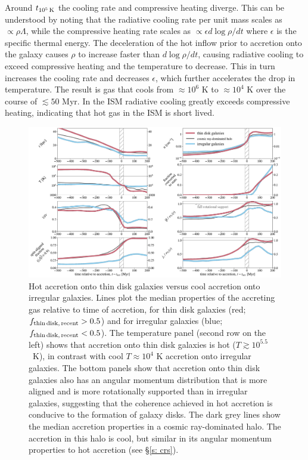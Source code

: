 \documentclass[fleqn,usenatbib]{mnras}
\newcommand{\fthin}{f_{\rm thin\,disk,\,recent}}
\newcommand{\tcools}{t_{10^5\,{\rm K}}}
\begin{document}
Around $\tcools$ the cooling rate and compressive heating diverge.
This can be understood by noting that the radiative cooling rate per unit mass scales as $\propto\rho\Lambda$, while the compressive heating rate scales as $\propto\epsilon d\log\rho/d t$ where $\epsilon$ is the specific thermal energy.
The deceleration of the hot inflow prior to accretion onto the galaxy causes $\rho$ to increase faster than $d\log\rho/d t$, causing radiative cooling to exceed compressive heating and the temperature to decrease.
This in turn increases the cooling rate and decreases $\epsilon$, which further accelerates the drop in temperature.
The result is gas that cools from $\approx10^6$ K to $\approx10^4$ K over the course of $\lesssim 50$ Myr.
In the ISM radiative cooling greatly exceeds compressive heating, indicating that hot gas in the ISM is short lived. 

\begin{figure}
    \centering
    \includegraphics[width=\textwidth]{figures/variations/relative_to_accretion/before_and_after/before_and_after_combined2.pdf}
    \caption{
    Hot accretion onto thin disk galaxies versus cool accretion onto irregular galaxies.
    Lines plot the median properties of the accreting gas relative to time of accretion, for thin disk galaxies (red; $\fthin>0.5$) and for irregular galaxies (blue; $\fthin<0.5$).
    The temperature panel (second row on the left) shows that accretion onto thin disk galaxies is hot ($T\gtrsim10^{5.5}$~K), in contrast with cool $T\approx10^4$ K accretion onto irregular galaxies.
    The bottom panels show that accretion onto thin disk galaxies also has an angular momentum distribution that is more aligned and is more rotationally supported than in irregular galaxies, suggesting that the coherence achieved in hot accretion is conducive to the formation of galaxy disks. 
    The dark grey lines show the median accretion properties in a cosmic ray-dominated halo.
    The accretion in this halo is cool, but similar in its angular momentum properties to hot accretion (see \S\ref{s: crs}). 
    }
    \label{f: before and after combined}
\end{figure}
\end{document}
